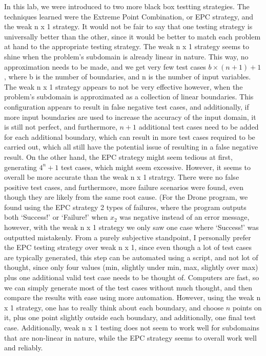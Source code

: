 In this lab, we were introduced to two more black box testting strategies. The
techniques learned were the Extreme Point Combination, or EPC strategy, and the
weak n x 1 strategy. It would not be fair to say that one testing strategy
is universally better than the other, since it would be better to match
each problem at hand to the appropriate testing strategy. The weak n x 1
strategy seems to shine when the problem's subdomain is already linear in
nature. This way, no approximation needs to be made, and we get very few
test cases $b \times (n + 1) + 1$, where b is the number of boundaries, and
n is the number of input variables. The weak n x 1 strategy appears to not
be very effective however, when the problem's subdomain is approximated as
a collection of linear boundaries. This configuration appears to result in
false negative test cases, and additionally, if more input boundaries are
used to increase the accuracy of the input domain, it is still not perfect,
and furthermore, $n + 1$ additional test cases need to be added for each
additional boundary, which can result in more test cases required to be carried
out, which all still have the potential issue of resulting in a false
negative result. On the other hand, the EPC strategy might seem tedious
at first, generating $4^n + 1$ test cases, which might seem excessive.
However, it seems to overall be more accurate than the weak n x 1 stratrgy.
There were no false positive test cases, and furthermore, more failure
scenarios were found, even though they are likely from the same root cause.
(For the Drone program, we found using the EPC strategy 2 types of failures,
where the program outputs both `Success!'
or `Failure!' when $x_2$ was negative instead of an error message, however,
with the weak n x 1 strategy we only saw one case where
`Success!' was outputted mistakenly. From a purely subjective standpoint,
I personally prefer the EPC testing strategy over weak n x 1, since
even though a lot of test cases are typically generated, this step can be
automated using a script, and not lot of thought, since only four values
(min, slightly under min, max, slightly over max) plus one additional
valid test case needs to be thought of. Computers are fast, so we can simply
generate most of the test cases without much thought, and then compare the
results with ease using more automation. However, using the weak n x 1
strategy, one has to really think about each boundary, and choose $n$ points on
it, plus one point slightly outside each boundary, and additionally, one final
test case. Additionally, weak n x 1 testing does not seem to work well for
subdomains that are non-linear in nature, while the EPC strategy seems to
overall work well and reliably.
